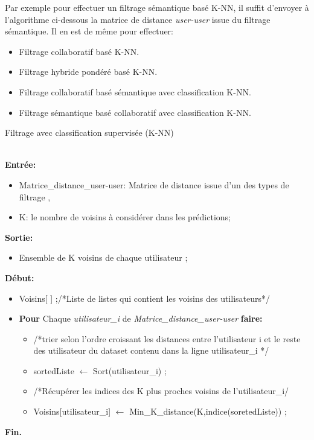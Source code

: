 Par exemple pour effectuer un filtrage sémantique basé K-NN, il suffit d'envoyer à l'algorithme ci-dessous la matrice de distance \textit{user-user} issue du filtrage sémantique.
Il en est de même pour effectuer:
\begin{itemize}
	\item Filtrage collaboratif basé K-NN.
	\item Filtrage hybride pondéré basé K-NN.
	\item Filtrage collaboratif basé sémantique avec classification K-NN.
	\item Filtrage sémantique basé collaboratif avec  classification K-NN.
\end{itemize}

\begin{algorithm}[H]
	\caption{Filtrage avec classification supervisée (K-NN)}
	\hspace*{\algorithmicindent} \\
	\hspace*{\algorithmicindent} \textbf{Entrée:} \begin{itemize}
		\item [] Matrice{\_}distance{\_}user-user: Matrice de distance issue d'un des types de filtrage , 
		\item []  K: le nombre de voisins à considérer dans les prédictions;
	\end{itemize}
	\hspace*{\algorithmicindent} \textbf{Sortie:} 
	\begin{itemize}
		\item [] Ensemble de K voisins de chaque utilisateur ;
	\end{itemize}
	
	\hspace*{\algorithmicindent}\textbf{ Début:}
	
	\begin{itemize}
		\item [] Voisins[ ] ;/*Liste de listes qui contient les voisins des utilisateurs*/
		\item [] \textbf{Pour} Chaque \textit{utilisateur{\_}i} de \textit{ Matrice{\_}distance{\_}user-user} \textbf{faire:} 
			
			\begin{itemize}
				\item [] /*trier selon l'ordre croissant les distances entre l'utilisateur i et le reste des utilisateur du dataset contenu dans la ligne utilisateur{\_}i */
				\item []	sortedListe $\leftarrow$ Sort(utilisateur{\_}i) ;
			\item []	/*Récupérer les indices des K plus proches voisins de l'utilisateur{\_}i/
				\item [] Voisins[utilisateur{\_}i] $\leftarrow$ Min{\_}K{\_}distance(K,indice(soretedListe)) ;
				
			\end{itemize}
		\end{itemize}
		
		\hspace*{\algorithmicindent}\textbf{ Fin.}
	\end{algorithm} 

